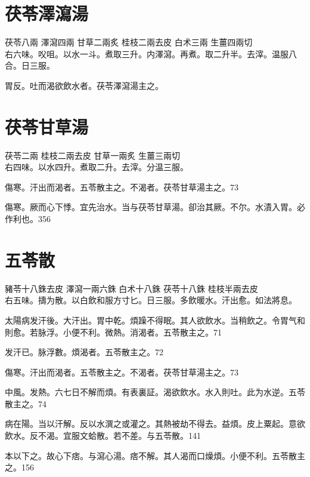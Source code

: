 \section{茯苓澤瀉湯}

茯苓{\scriptsize 八兩} 澤瀉{\scriptsize 四兩} 甘草{\scriptsize 二兩炙} 桂枝{\scriptsize 二兩去皮} 白术{\scriptsize 三兩} 生薑{\scriptsize 四兩切}\\
右六味。㕮咀。以水一斗。煮取三升。内澤瀉。再煮。取二升半。去滓。温服八合。日三服。

胃反。吐而渴欲飲水者。茯苓澤瀉湯主之。


\section{茯苓甘草湯}

茯苓{\scriptsize 二兩} 桂枝{\scriptsize 二兩去皮} 甘草{\scriptsize 一兩炙} 生薑{\scriptsize 三兩切}\\
右四味。以水四升。煮取二升。去滓。分温三服。

傷寒。汗出而渴者。五苓散主之。不渴者。茯苓甘草湯主之。73

傷寒。厥而心下悸。宜先治水。当与茯苓甘草湯。卻治其厥。不尔。水漬入胃。必作利也。356

\section{五苓散}

豬苓{\scriptsize 十八銖去皮} 澤瀉{\scriptsize 一兩六銖} 白术{\scriptsize 十八銖} 茯苓{\scriptsize 十八銖} 桂枝{\scriptsize 半兩去皮}\\
右五味。擣为散。以白飲和服方寸匕。日三服。多飲暖水。汗出愈。如法將息。

太陽病发汗後。大汗出。胃中乾。煩躁不得眠。其人欲飲水。当稍飲之。令胃气和則愈。若脉浮。小便不利。微熱。消渴者。五苓散主之。71

发汗已。脉浮數。煩渴者。五苓散主之。72

傷寒。汗出而渴者。五苓散主之。不渴者。茯苓甘草湯主之。73

中風。发熱。六七日不解而煩。有表裏証。渴欲飲水。水入則吐。此为水逆。五苓散主之。74

病在陽。当以汗解。反以水潠之或灌之。其熱被劫不得去。益煩。皮上粟起。意欲飲水。反不渴。宜服文蛤散。若不差。与五苓散。141

本以下之。故心下痞。与瀉心湯。痞不解。其人渴而口燥{\khaaitp 煩}。小便不利。五苓散主之。156


